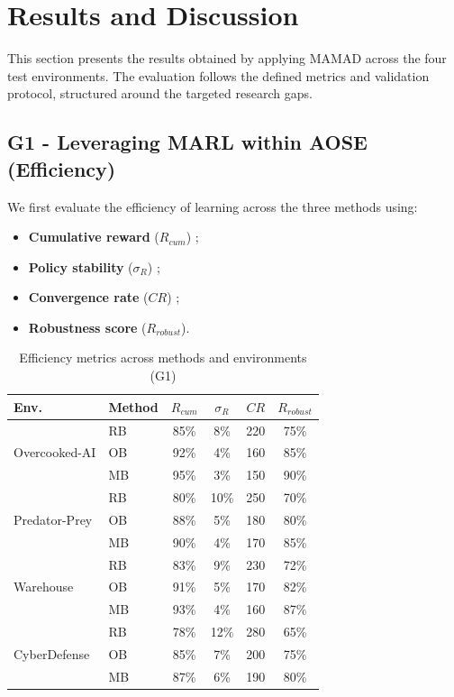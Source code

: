 \documentclass[pdflatex,sn-mathphys-num]{sn-jnl}%
\theoremstyle{thmstyleone}%
\theoremstyle{thmstyletwo}%
\theoremstyle{thmstylethree}%
\begin{document}
\section{Results and Discussion} \label{sec:results}

This section presents the results obtained by applying MAMAD across the four test environments. The evaluation follows the defined metrics and validation protocol, structured around the targeted research gaps.

\subsection{G1 - Leveraging MARL within AOSE (Efficiency)}

We first evaluate the efficiency of learning across the three methods using:

\begin{itemize}
    \item \textbf{Cumulative reward} ($R_{cum}$) ;
    \item \textbf{Policy stability} ($\sigma_R$) ;
    \item \textbf{Convergence rate} ($CR$) ;
    \item \textbf{Robustness score} ($R_{robust}$).
\end{itemize}

\begin{table}[h!]
    \centering
    \caption{Efficiency metrics across methods and environments (G1)}
    \begin{tabular}{l|l|cccc}
        \hline
        \textbf{Env.} & \textbf{Method} & $R_{cum}$ & $\sigma_R$ & $CR$ & $R_{robust}$ \\
        \hline
        \multirow{3}{*}{Overcooked-AI}
        & RB & 85\% & 8\% & 220 & 75\% \\
        & OB & 92\% & 4\% & 160 & 85\% \\
        & MB & 95\% & 3\% & 150 & 90\% \\
        \hline
        \multirow{3}{*}{Predator-Prey}
        & RB & 80\% & 10\% & 250 & 70\% \\
        & OB & 88\% & 5\% & 180 & 80\% \\
        & MB & 90\% & 4\% & 170 & 85\% \\
        \hline
        \multirow{3}{*}{Warehouse}
        & RB & 83\% & 9\% & 230 & 72\% \\
        & OB & 91\% & 5\% & 170 & 82\% \\
        & MB & 93\% & 4\% & 160 & 87\% \\
        \hline
        \multirow{3}{*}{CyberDefense}
        & RB & 78\% & 12\% & 280 & 65\% \\
        & OB & 85\% & 7\% & 200 & 75\% \\
        & MB & 87\% & 6\% & 190 & 80\% \\
        \hline
    \end{tabular}
    \label{tab:g1_efficiency_full}
\end{table}
\end{document}
